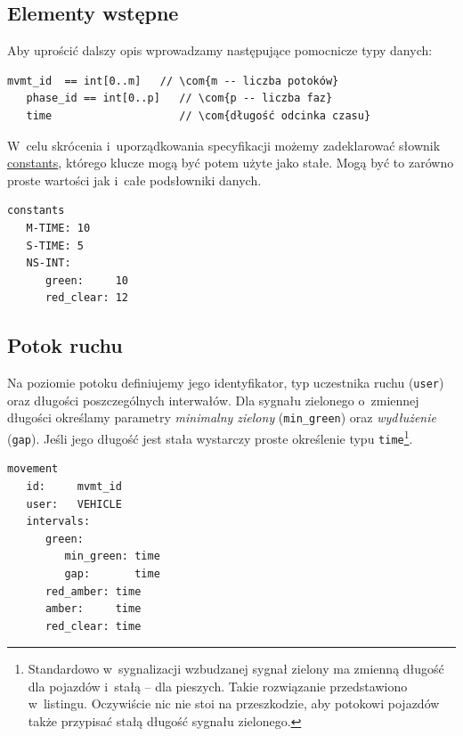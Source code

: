 \documentclass{pracamgr}
\theoremstyle{plain}
\newcommand{\com}[1]{\upshape\color{light-gray}{#1}}
\begin{document}
\subsection{Elementy wstępne}
Aby uprościć dalszy opis wprowadzamy następujące pomocnicze typy danych:
\begin{lstlisting}[caption=Pomocnicze typy danych.]
   mvmt_id  == int[0..m]   // \com{m -- liczba potoków}
   phase_id == int[0..p]   // \com{p -- liczba faz}
   time                    // \com{długość odcinka czasu}
\end{lstlisting}

W~celu skrócenia i~uporządkowania specyfikacji możemy zadeklarować słownik
\url{constants}, którego klucze mogą być potem użyte jako stałe. Mogą
być to zarówno proste wartości jak i~całe podsłowniki danych.

\noindent\begin{minipage}{1.0\linewidth}
\begin{lstlisting}[caption=Słownik stałych.]
constants
   M-TIME: 10
   S-TIME: 5
   NS-INT:
      green:     10
      red_clear: 12
\end{lstlisting}
\end{minipage}

\subsection{Potok ruchu}
Na poziomie potoku definiujemy jego identyfikator, typ uczestnika
ruchu (\texttt{user}) oraz długości poszczególnych interwałów.  Dla
sygnału zielonego o~zmiennej długości określamy parametry
\emph{minimalny zielony} (\texttt{min\_green}) oraz \emph{wydłużenie}
(\texttt{gap}). Jeśli jego długość jest stała wystarczy proste
określenie typu \texttt{time}\footnote{Standardowo w~sygnalizacji
  wzbudzanej sygnał zielony ma zmienną długość dla pojazdów i~stałą --
dla pieszych. Takie rozwiązanie przedstawiono w~listingu. Oczywiście
nic nie stoi na przeszkodzie, aby potokowi pojazdów także przypisać
stałą długość sygnału zielonego.}.

\noindent\begin{minipage}{1.0\linewidth}
\begin{lstlisting}[caption=Schemat opisu potoku pojazdów.]
movement
   id:     mvmt_id
   user:   VEHICLE
   intervals:
      green:
         min_green: time
         gap:       time
      red_amber: time
      amber:     time
      red_clear: time
\end{lstlisting}
\end{minipage}
\end{document}
